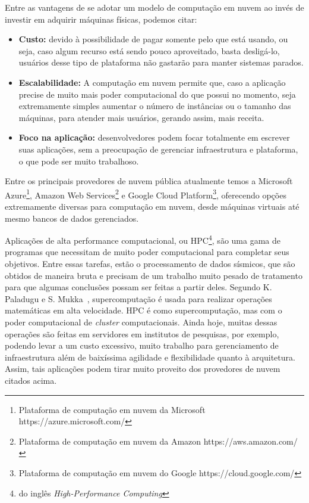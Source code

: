 \documentclass[11pt,twoside]{article}
\begin{document}
Entre as vantagens de se adotar um modelo de computação em nuvem ao invés de investir em adquirir máquinas físicas, podemos citar:

\begin{itemize}
  \item \textbf{Custo:} devido à possibilidade de pagar somente pelo que está usando, ou seja, caso algum recurso está sendo pouco aproveitado, basta desligá-lo, usuários desse tipo de 
  plataforma não gastarão para manter sistemas parados.
  \item \textbf{Escalabilidade:} A computação em nuvem permite que, caso a aplicação precise de muito mais poder computacional do que possui no momento, seja extremamente simples aumentar
  o número de instâncias ou o tamanho das máquinas, para atender mais usuários, gerando assim, mais receita.
  \item \textbf{Foco na aplicação:} desenvolvedores podem focar totalmente em escrever suas 
  aplicações, sem a preocupação de gerenciar infraestrutura e plataforma, o que pode ser muito trabalhoso.

\end{itemize}

Entre os principais provedores de nuvem pública atualmente temos a Microsoft Azure\footnote{Plataforma de computação em nuvem da Microsoft https://azure.microsoft.com/}, 
Amazon Web Services\footnote{Plataforma de computação em nuvem da Amazon https://aws.amazon.com/} e Google Cloud Platform\footnote{Plataforma de computação em nuvem do Google https://cloud.google.com/}, 
oferecendo opções extremamente diversas para computação em nuvem, desde máquinas virtuais até mesmo bancos de dados gerenciados.

Aplicações de alta performance computacional, ou HPC\footnote{do inglês \emph{High-Performance Computing}}, são uma gama de programas que necessitam de muito poder computacional para 
completar seus objetivos. Entre essas tarefas, estão o processamento de dados sísmicos, que são obtidos de maneira bruta e precisam de um trabalho muito pesado de tratamento
para que algumas conclusões possam ser feitas a partir deles. Segundo K. Paladugu e S. Mukka~\cite{HPC}, supercomputação é usada para realizar operações matemáticas em alta velocidade. HPC é como supercomputação,
mas com o poder computacional de \emph{cluster} computacionais.
Ainda hoje, muitas dessas operações são feitas em servidores em institutos de pesquisas, por exemplo, podendo levar
a um custo excessivo, muito trabalho para gerenciamento de infraestrutura além de baixíssima agilidade e flexibilidade quanto à arquitetura. Assim, tais aplicações podem 
tirar muito proveito dos provedores de nuvem citados acima.
\end{document}
